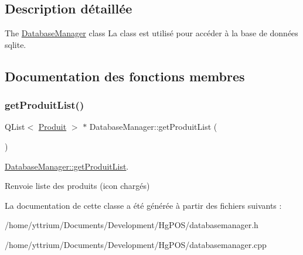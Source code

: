 \subsection{Description détaillée}
The \hyperlink{classDatabaseManager}{Database\+Manager} class La class est utilisé pour accéder à la base de données sqlite. 

\subsection{Documentation des fonctions membres}
\mbox{\label{classDatabaseManager_a00bdab5cbbf85a15d297706509b474af}} 
\subsubsection{\texorpdfstring{get\+Produit\+List()}{getProduitList()}}
{\footnotesize\ttfamily Q\+List$<$ \hyperlink{classProduit}{Produit} $>$ $\ast$ Database\+Manager\+::get\+Produit\+List (\begin{DoxyParamCaption}{ }\end{DoxyParamCaption})}



\hyperlink{classDatabaseManager_a00bdab5cbbf85a15d297706509b474af}{Database\+Manager\+::get\+Produit\+List}. 

\begin{DoxyReturn}{Renvoie}
liste des produits (icon chargés) 
\end{DoxyReturn}


La documentation de cette classe a été générée à partir des fichiers suivants \+:\begin{DoxyCompactItemize}
\item 
/home/yttrium/\+Documents/\+Development/\+Hg\+P\+O\+S/databasemanager.\+h\item 
/home/yttrium/\+Documents/\+Development/\+Hg\+P\+O\+S/databasemanager.\+cpp\end{DoxyCompactItemize}
